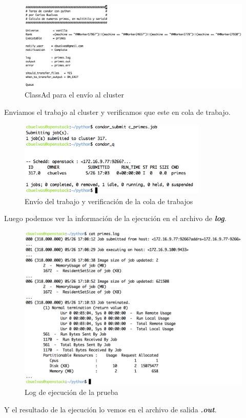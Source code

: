 \begin{figure}[h]
\centering
\includegraphics[width=1\textwidth]{images/pythonsub.png}
\decoRule
\caption{ClassAd para el envío al cluster}
\label{fig:python submit}
\end{figure}
\FloatBarrier

Enviamos el trabajo al cluster y verificamos que este en cola de trabajo.

\begin{figure}[h]
\centering
\includegraphics[width=0.8\textwidth]{images/condorsub.png}
\decoRule
\caption{Envío del trabajo y verificación de la cola de trabajos}
\label{fig:condor submit and q}
\end{figure}
\FloatBarrier

Luego podemos ver la información de la ejecución en el archivo de \textbf{\textit{log}}.
\begin{figure}[h]
\centering
\includegraphics[width=1\textwidth]{images/pythonlog.png}
\decoRule
\caption{Log de ejecución de la prueba}
\label{fig:python log}
\end{figure}
\FloatBarrier
 Y el resultado de la ejecución lo vemos en el archivo de salida \textbf{\textit{.out}}.
 
